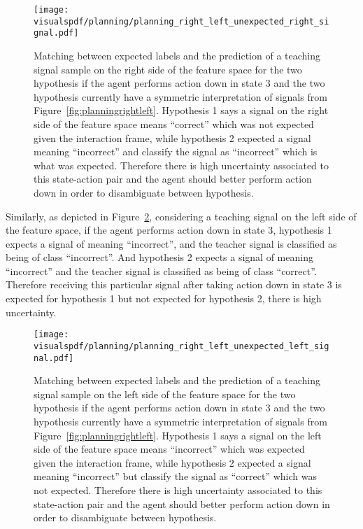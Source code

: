 \begin{figure}[!htbp]
  \centering
  \texttt{[image: \\visualspdf/planning/planning\_right\_left\_unexpected\_right\_signal.pdf]}
  \caption{Matching between expected labels and the prediction of a teaching signal sample on the right side of the feature space for the two hypothesis if the agent performs action down in state 3 and the two hypothesis currently have a symmetric interpretation of signals from Figure~\ref{fig:planningrightleft}. Hypothesis 1 says a signal on the right side of the feature space means ``correct'' which was not expected given the interaction frame, while hypothesis 2 expected a signal meaning ``incorrect'' and classify the signal as ``incorrect'' which is what was expected. Therefore there is high uncertainty associated to this state-action pair and the agent should better perform action down in order to disambiguate between hypothesis.}
  \label{fig:uncertaintymeaningrightleftunexpectedright}
\end{figure}

Similarly, as depicted in Figure~\ref{fig:uncertaintymeaningrightleftunexpectedleft}, considering a teaching signal on the left side of the feature space, if the agent performs action down in state 3, hypothesis 1 expects a signal of meaning ``incorrect'', and the teacher signal is classified as being of class ``incorrect''. And hypothesis 2 expects a signal of meaning ``incorrect'' and the teacher signal is classified as being of class ``correct''. Therefore receiving this particular signal after taking action down in state 3 is expected for hypothesis 1 but not expected for hypothesis 2, there is high uncertainty.

\begin{figure}[!htbp]
  \centering
  \texttt{[image: \\visualspdf/planning/planning\_right\_left\_unexpected\_left\_signal.pdf]}
  \caption{Matching between expected labels and the prediction of a teaching signal sample on the left side of the feature space for the two hypothesis if the agent performs action down in state 3 and the two hypothesis currently have a symmetric interpretation of signals from Figure~\ref{fig:planningrightleft}. Hypothesis 1 says a signal on the left side of the feature space means ``incorrect'' which was expected given the interaction frame, while hypothesis 2 expected a signal meaning ``incorrect'' but classify the signal as ``correct'' which was not expected. Therefore there is high uncertainty associated to this state-action pair and the agent should better perform action down in order to disambiguate between hypothesis.}
  \label{fig:uncertaintymeaningrightleftunexpectedleft}
\end{figure}

